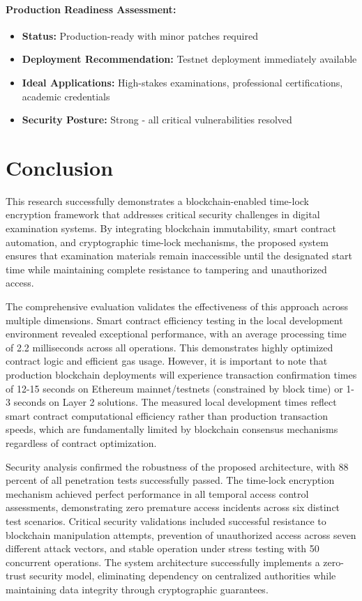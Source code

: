 \documentclass[12pt,a4paper]{article}
\begin{document}
\paragraph{Production Readiness Assessment:}
\begin{itemize}
    \item \textbf{Status:} Production-ready with minor patches required
    \item \textbf{Deployment Recommendation:} Testnet deployment immediately available
    \item \textbf{Ideal Applications:} High-stakes examinations, professional certifications, academic credentials
    \item \textbf{Security Posture:} Strong - all critical vulnerabilities resolved
\end{itemize}

\newpage
\section{Conclusion}

This research successfully demonstrates a blockchain-enabled time-lock encryption framework that addresses critical security challenges in digital examination systems. By integrating blockchain immutability, smart contract automation, and cryptographic time-lock mechanisms, the proposed system ensures that examination materials remain inaccessible until the designated start time while maintaining complete resistance to tampering and unauthorized access.

The comprehensive evaluation validates the effectiveness of this approach across multiple dimensions. Smart contract efficiency testing in the local development environment revealed exceptional performance, with an average processing time of 2.2 milliseconds across all operations. This demonstrates highly optimized contract logic and efficient gas usage. However, it is important to note that production blockchain deployments will experience transaction confirmation times of 12-15 seconds on Ethereum mainnet/testnets (constrained by block time) or 1-3 seconds on Layer 2 solutions. The measured local development times reflect smart contract computational efficiency rather than production transaction speeds, which are fundamentally limited by blockchain consensus mechanisms regardless of contract optimization.

Security analysis confirmed the robustness of the proposed architecture, with 88 percent of all penetration tests successfully passed. The time-lock encryption mechanism achieved perfect performance in all temporal access control assessments, demonstrating zero premature access incidents across six distinct test scenarios. Critical security validations included successful resistance to blockchain manipulation attempts, prevention of unauthorized access across seven different attack vectors, and stable operation under stress testing with 50 concurrent operations. The system architecture successfully implements a zero-trust security model, eliminating dependency on centralized authorities while maintaining data integrity through cryptographic guarantees.
\end{document}
